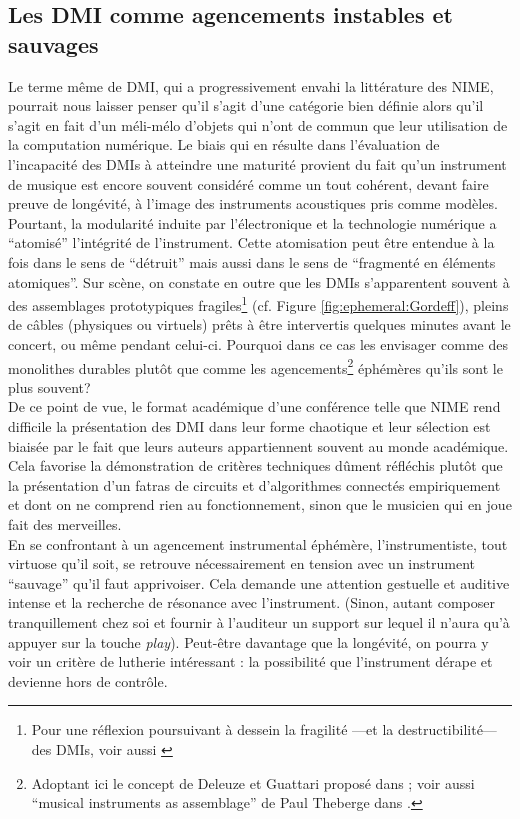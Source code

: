 \subsection{Les DMI comme agencements instables et sauvages}

\noindent Le terme même de \gls{DMI}, qui a progressivement envahi la littérature des \gls{NIME}, pourrait nous laisser penser qu'il s'agit d'une catégorie bien définie alors qu'il s'agit en fait d'un méli-mélo d'objets qui n'ont de commun que leur utilisation de la computation numérique. Le biais qui en résulte dans l'évaluation de l'incapacité des \glspl{DMI} à atteindre une maturité provient du fait qu'un instrument de musique est encore souvent considéré comme un tout cohérent, devant faire preuve de longévité, à l’image des instruments acoustiques pris comme modèles.\\
\indent Pourtant, la modularité induite par l'électronique et la technologie numérique a ``atomisé'' l'intégrité de l'instrument. Cette atomisation peut être entendue à la fois dans le sens de ``détruit'' mais aussi dans le sens de ``fragmenté en éléments atomiques''. Sur scène, on constate en outre que les \glspl{DMI} s'apparentent souvent à des assemblages prototypiques fragiles\footnote{Pour une réflexion poursuivant à dessein la fragilité —et la destructibilité— des \glspl{DMI}, voir aussi \cite{haddad_fragile_2017}} (cf. Figure \ref{fig:ephemeral:Gordeff}), pleins de câbles (physiques ou virtuels) prêts à être intervertis quelques minutes avant le concert, ou même pendant celui-ci. Pourquoi dans ce cas les envisager comme des monolithes durables plutôt que comme les agencements\footnote{Adoptant ici le concept de Deleuze et Guattari proposé dans \cite{deleuze_mille_1980}; voir aussi ``musical instruments as assemblage'' de Paul Theberge dans \cite{bovermann_musical_2017}.} éphémères qu’ils sont le plus souvent?\\
\indent De ce point de vue, le format académique d'une conférence telle que \gls{NIME} rend difficile la présentation des \gls{DMI} dans leur forme chaotique et leur sélection est biaisée par le fait que leurs auteurs appartiennent souvent au monde académique. Cela favorise la démonstration de critères techniques dûment réfléchis plutôt que la présentation d'un fatras de circuits et d'algorithmes connectés empiriquement et dont on ne comprend rien au fonctionnement, sinon que le musicien qui en joue fait des merveilles.\\
\indent En se confrontant à un agencement instrumental éphémère, l'instrumentiste, tout virtuose qu'il soit, se retrouve nécessairement en tension avec un instrument ``sauvage'' qu'il faut apprivoiser. Cela demande une attention gestuelle et auditive intense et la recherche de résonance avec l'instrument. (Sinon, autant composer tranquillement chez soi et fournir à l’auditeur un support sur lequel il n’aura qu’à appuyer sur la touche \textit{play}). Peut-être davantage que la longévité, on pourra y voir un critère de lutherie intéressant : la possibilité que l'instrument dérape et devienne hors de contrôle.

